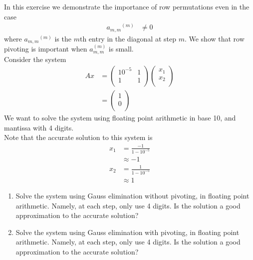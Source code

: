 \documentclass[fleqn, a4paper, 11pt, oneside]{amsart}
\theoremstyle{definition}
\theoremstyle{theorem}
\begin{document}
\begin{question}
	In this exercise we demonstrate the importance of row permutations even in the case
	\begin{align*}
		{a_{m,m}}^{(m)} &\neq 0
	\end{align*}
	where ${a_{m,m}}^{(m)}$ is the $m$th entry in the diagonal at step $m$.
	We show that row pivoting is important when $a_{m,m}^{(m)}$ is small.\\
	Consider the system
	\begin{align*}
		A x &=
			\begin{pmatrix}
				10^{-5} & 1 \\
				1       & 1 \\
			\end{pmatrix}
			\begin{pmatrix}
				x_1 \\
				x_2 \\
			\end{pmatrix}\\
		&=
			\begin{pmatrix}
				1 \\
				0 \\
			\end{pmatrix}
	\end{align*}
	We want to solve the system using floating point arithmetic in base 10, and mantissa with 4 digits.\\
	Note that the accurate solution to this system is
	\begin{align*}
		x_1 & = \frac{-1}{1 - 10^{-5}} \\
                    & \approx -1               \\
		x_2 & = \frac{1}{1 - 10^{-5}}  \\
                    & \approx 1
	\end{align*}
	\begin{enumerate}
		\item
			Solve the system using Gauss elimination without pivoting, in floating point arithmetic.
			Namely, at each step, only use 4 digits.
			Is the solution a good approximation to the accurate solution?
		\item
			Solve the system using Gauss elimination with pivoting, in floating point arithmetic.
			Namely, at each step, only use 4 digits.
			Is the solution a good approximation to the accurate solution?
	\end{enumerate}
\end{question}
\end{document}

